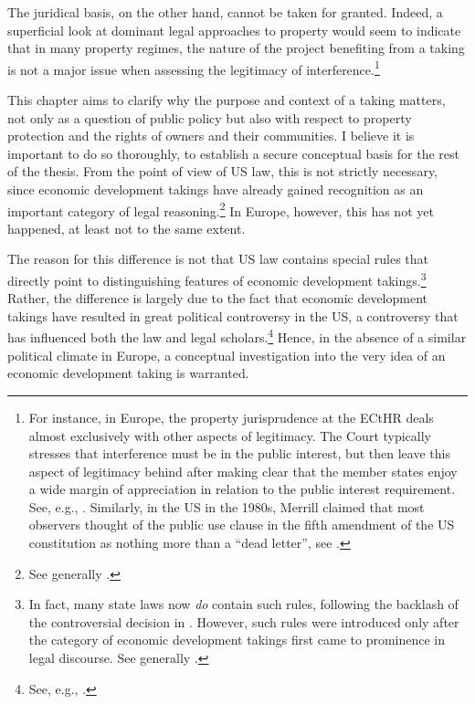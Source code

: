 The juridical basis, on the other hand, cannot be taken for granted. Indeed, a superficial look at dominant legal approaches to property would seem to indicate that in many property regimes, the nature of the project benefiting from a taking is not a major issue when assessing the legitimacy of interference.\footnote{For instance, in Europe, the property jurisprudence at the ECtHR deals almost exclusively with other aspects of legitimacy. The Court typically stresses that interference must be in the public interest, but then leave this aspect of legitimacy behind after making clear that the member states enjoy a wide margin of appreciation in relation to the public interest requirement. See, e.g., \cite{james86,lindheim12}. Similarly, in the US in the 1980s, Merrill claimed that most observers thought of the public use clause in the fifth amendment of the US constitution as nothing more than a ``dead letter'', see \cite[61]{merrill86}.} 

This chapter aims to clarify why the purpose and context of a taking matters, not only as a question of public policy but also with respect to property protection and the rights of owners and their communities. I believe it is important to do so thoroughly, to establish a secure conceptual basis for the rest of the thesis. From the point of view of US law, this is not strictly necessary, since economic development takings have already gained recognition as an important category of legal reasoning.\footnote{See generally \cite{cohen06,somin07,malloy08}.} In Europe, however, this has not yet happened, at least not to the same extent.

The reason for this difference is not that US law contains special rules that directly point to distinguishing features of economic development takings.\footnote{In fact, many state laws now {\it do} contain such rules, following the backlash of the controversial decision in \cite{kelo05}. However, such rules were introduced only after the category of economic development takings first came to prominence in legal discourse. See generally \cite{eagle08,somin09,jacobs11}.} Rather, the difference is largely due to the fact that economic development takings have resulted in great political controversy in the US, a controversy that has influenced both the law and legal scholars.\footnote{See, e.g., \cite[1190-1192]{somin08}.} Hence, in the absence of a similar political climate in Europe, a conceptual investigation into the very idea of an economic development taking is warranted.

